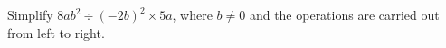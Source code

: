 Simplify $8ab^2\div(-2b)^2\times5a$, where $b\ne0$ and the operations are carried out from left to right.
